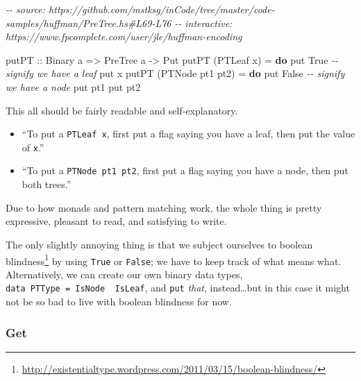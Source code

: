 \documentclass[]{article}
\newenvironment{Shaded}{}{}
\newcommand{\CommentTok}[1]{\textcolor[rgb]{0.38,0.63,0.69}{\textit{#1}}}
\newcommand{\DataTypeTok}[1]{\textcolor[rgb]{0.56,0.13,0.00}{#1}}
\newcommand{\KeywordTok}[1]{\textcolor[rgb]{0.00,0.44,0.13}{\textbf{#1}}}
\newcommand{\NormalTok}[1]{#1}
\newcommand{\OtherTok}[1]{\textcolor[rgb]{0.00,0.44,0.13}{#1}}
\renewcommand{\href}[2]{#2\footnote{\url{#1}}}
\begin{document}
\begin{Shaded}
\begin{Highlighting}[]
\CommentTok{{-}{-} source: https://github.com/mstksg/inCode/tree/master/code{-}samples/huffman/PreTree.hs\#L69{-}L76}
\CommentTok{{-}{-} interactive: https://www.fpcomplete.com/user/jle/huffman{-}encoding}

\OtherTok{putPT ::} \DataTypeTok{Binary}\NormalTok{ a }\OtherTok{=\textgreater{}} \DataTypeTok{PreTree}\NormalTok{ a }\OtherTok{{-}\textgreater{}} \DataTypeTok{Put}
\NormalTok{putPT (}\DataTypeTok{PTLeaf}\NormalTok{ x) }\OtherTok{=} \KeywordTok{do}
\NormalTok{    put }\DataTypeTok{True}                    \CommentTok{{-}{-} signify we have a leaf}
\NormalTok{    put x}
\NormalTok{putPT (}\DataTypeTok{PTNode}\NormalTok{ pt1 pt2) }\OtherTok{=} \KeywordTok{do}
\NormalTok{    put }\DataTypeTok{False}                   \CommentTok{{-}{-} signify we have a node}
\NormalTok{    put pt1}
\NormalTok{    put pt2}
\end{Highlighting}
\end{Shaded}

This all should be fairly readable and self-explanatory.

\begin{itemize}
\item
  ``To put a \texttt{PTLeaf\ x}, first put a flag saying you have a leaf, then
  put the value of \texttt{x}.''
\item
  ``To put a \texttt{PTNode\ pt1\ pt2}, first put a flag saying you have a node,
  then put both trees.''
\end{itemize}

Due to how monads and pattern matching work, the whole thing is pretty
expressive, pleasant to read, and satisfying to write.

The only slightly annoying thing is that we subject ourselves to
\href{http://existentialtype.wordpress.com/2011/03/15/boolean-blindness/}{boolean
blindness} by using \texttt{True} or \texttt{False}; we have to keep track of
what means what. Alternatively, we can create our own binary data types,
\texttt{data\ PTType\ =\ IsNode\ \textbar{}\ IsLeaf}, and \texttt{put}
\emph{that}, instead\ldots but in this case it might not be so bad to live with
boolean blindness for now.

\subsubsection{Get}\label{get}
\end{document}
